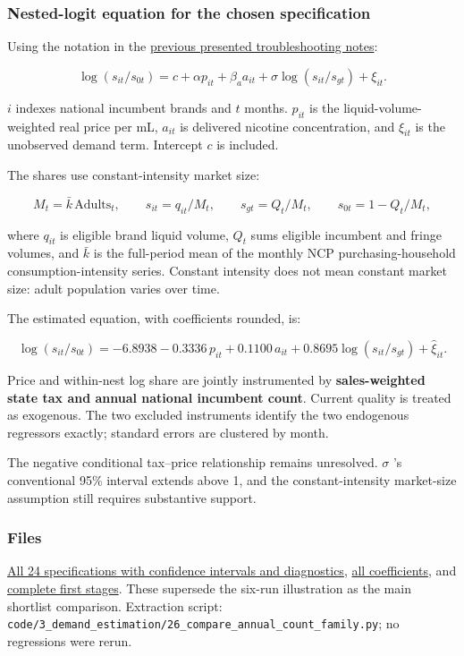 \documentclass[10pt,]{article}
\begin{document}
\subsubsection{Nested-logit equation for the chosen
specification}\label{nested-logit-equation-for-the-chosen-specification}

Using the notation in the
\href{../presented/sigma_troubleshooting_marc_2026-10-14.md}{previous
presented troubleshooting notes}:

\[
\log(s_{it}/s_{0t})
= c + \alpha  p_{it} + \beta_a a_{it}
+ \sigma\log(s_{it}/s_{gt}) + \xi_{it}.
\]

\(i\) indexes national incumbent brands and \(t\) months. \(p_{it}\) is
the liquid-volume-weighted real price per mL, \(a_{it}\) is delivered
nicotine concentration, and \(\xi_{it}\) is the unobserved demand term.
Intercept \(c\) is included.

The shares use constant-intensity market size:

\[
M_t=\bar{k}\,\mathrm{Adults}_t,\qquad
s_{it}=q_{it}/M_t,\qquad
s_{gt}=Q_t/M_t,\qquad
s_{0t}=1-Q_t/M_t,
\]

where \(q_{it}\) is eligible brand liquid volume, \(Q_t\) sums eligible
incumbent and fringe volumes, and \(\bar{k}\) is the full-period mean of
the monthly NCP purchasing-household consumption-intensity series.
Constant intensity does not mean constant market size: adult population
varies over time.

The estimated equation, with coefficients rounded, is:

\[
\log(s_{it}/s_{0t})
= -6.8938 - 0.3336\,p_{it} + 0.1100\,a_{it}
+ 0.8695\log(s_{it}/s_{gt}) + \widehat{\xi}_{it}.
\]

Price and within-nest log share are jointly instrumented by
\textbf{sales-weighted state tax and annual national incumbent count}.
Current quality is treated as exogenous. The two excluded instruments
identify the two endogenous regressors exactly; standard errors are
clustered by month.

The negative conditional tax--price relationship remains unresolved.
\(\sigma\) 's conventional 95\% interval extends above 1, and the
constant-intensity market-size assumption still requires substantive
support.

\subsubsection{Files}\label{files}

\href{tables/2026-10-27_annual_count_all24_comparison.csv}{All 24
specifications with confidence intervals and diagnostics},
\href{tables/2026-10-27_annual_count_all24_coefficients.csv}{all
coefficients}, and
\href{tables/2026-10-27_annual_count_all24_first_stages.csv}{complete
first stages}. These supersede the six-run illustration as the main
shortlist comparison. Extraction script:
\texttt{code/3\_demand\_estimation/26\_compare\_annual\_count\_family.py};
no regressions were rerun.
\end{document}
